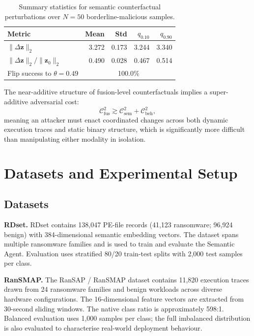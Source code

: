 \begin{table}[ht]
\centering
\caption{Summary statistics for semantic counterfactual perturbations over $N=50$ borderline-malicious samples.}
\label{tab:eswa_sem_cf_summary}
\begin{tabular}{lrrrr}
\toprule
\textbf{Metric} & \textbf{Mean} & \textbf{Std} & $q_{0.10}$ & $q_{0.90}$ \\
\midrule
$\|\Delta\mathbf{z}\|_2$ & 3.272 & 0.173 & 3.244 & 3.340 \\
$\|\Delta\mathbf{z}\|_2 / \|\mathbf{z}_0\|_2$ & 0.490 & 0.028 & 0.467 & 0.514 \\
Flip success to $\theta=0.49$ & \multicolumn{4}{c}{100.0\%} \\
\bottomrule
\end{tabular}
\end{table}

The near-additive structure of fusion-level counterfactuals implies a super-additive adversarial cost:
\begin{equation}
\mathcal{C}_\text{fus}^2 \gtrsim \mathcal{C}_\text{sem}^2 + \mathcal{C}_\text{beh}^2,
\label{eq:eswa_adv_cost}
\end{equation}
meaning an attacker must enact coordinated changes across both dynamic execution traces and static binary structure, which is significantly more difficult than manipulating either modality in isolation.


\section{Datasets and Experimental Setup}
\label{sec:eswa_setup}

\subsection{Datasets}

\textbf{RDset.} RDset \cite{mathur2020ransomware} contains 138,047 PE-file records (41,123 ransomware; 96,924 benign) with 384-dimensional semantic embedding vectors. The dataset spans multiple ransomware families and is used to train and evaluate the Semantic Agent. Evaluation uses stratified 80/20 train-test splits with 2,000 test samples per class.

\textbf{RanSMAP.} The RanSAP / RanSMAP dataset \cite{hirano2022ransap, hirano2025ransmap} contains 11,820 execution traces drawn from 24 ransomware families and benign workloads across diverse hardware configurations. The 16-dimensional feature vectors are extracted from 30-second sliding windows. The native class ratio is approximately 598:1. Balanced evaluation uses 1,000 samples per class; the full imbalanced distribution is also evaluated to characterise real-world deployment behaviour.

